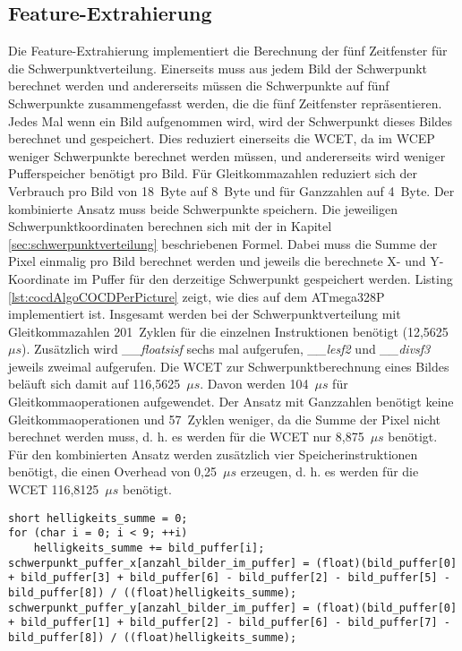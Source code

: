 \subsection{Feature-Extrahierung}
Die Feature-Extrahierung implementiert die Berechnung der fünf Zeitfenster für die Schwerpunktverteilung. Einerseits muss aus jedem Bild der Schwerpunkt berechnet werden und andererseits müssen die Schwerpunkte
auf fünf Schwerpunkte zusammengefasst werden, die die fünf Zeitfenster repräsentieren.
\newline
\newline
Jedes Mal wenn ein Bild aufgenommen wird, wird der Schwerpunkt dieses Bildes berechnet und gespeichert. Dies reduziert einerseits die WCET, da im WCEP weniger Schwerpunkte berechnet werden müssen, und andererseits
wird weniger Pufferspeicher benötigt pro Bild. Für Gleitkommazahlen reduziert sich der Verbrauch pro Bild von 18~Byte auf 8~Byte und für Ganzzahlen auf 4~Byte. Der kombinierte Ansatz muss beide Schwerpunkte speichern.
Die jeweiligen Schwerpunktkoordinaten berechnen sich mit der in Kapitel \ref{sec:schwerpunktverteilung} beschriebenen Formel. Dabei muss die Summe der Pixel einmalig pro Bild berechnet werden und jeweils die
berechnete X- und Y-Koordinate im Puffer für den derzeitige Schwerpunkt gespeichert werden.
\newline
\newline
Listing \ref{lst:cocdAlgoCOCDPerPicture} zeigt, wie dies auf dem ATmega328P implementiert ist. Insgesamt werden bei der
Schwerpunktverteilung mit Gleitkommazahlen 201~Zyklen für die einzelnen Instruktionen benötigt (12,5625~$\mu s$). Zusätzlich wird \textit{\_\_floatsisf} sechs mal aufgerufen, \textit{\_\_lesf2} und \textit{\_\_divsf3}
jeweils zweimal aufgerufen. Die WCET zur Schwerpunktberechnung eines Bildes beläuft sich damit auf 116,5625~$\mu s$. Davon werden 104~$\mu s$ für Gleitkommaoperationen aufgewendet. Der Ansatz mit Ganzzahlen benötigt
keine Gleitkommaoperationen und 57~Zyklen weniger, da die Summe der Pixel nicht berechnet werden muss, d. h. es werden für die WCET nur 8,875~$\mu s$ benötigt. Für den kombinierten Ansatz werden zusätzlich vier
Speicherinstruktionen benötigt, die einen Overhead von 0,25~$\mu s$ erzeugen, d. h. es werden für die WCET 116,8125~$\mu s$ benötigt.
\begin{lstlisting}[label=lst:cocdAlgoCOCDPerPicture,caption={Implementierung um den Schwerpunkt für ein Bild zu berechnen.}]
short helligkeits_summe = 0;
for (char i = 0; i < 9; ++i)
    helligkeits_summe += bild_puffer[i];
schwerpunkt_puffer_x[anzahl_bilder_im_puffer] = (float)(bild_puffer[0] + bild_puffer[3] + bild_puffer[6] - bild_puffer[2] - bild_puffer[5] - bild_puffer[8]) / ((float)helligkeits_summe);
schwerpunkt_puffer_y[anzahl_bilder_im_puffer] = (float)(bild_puffer[0] + bild_puffer[1] + bild_puffer[2] - bild_puffer[6] - bild_puffer[7] - bild_puffer[8]) / ((float)helligkeits_summe);
\end{lstlisting}
